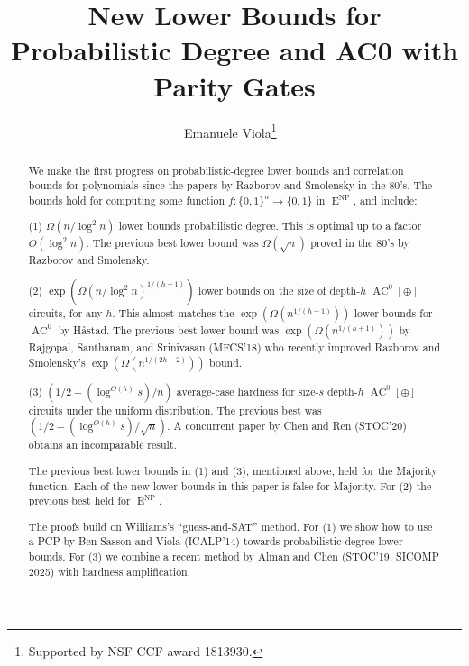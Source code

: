 \documentclass{toc}
\DeclareMathOperator{\AC}{\mathrm{AC}}  %
\DeclareMathOperator{\NP}{\mathrm{NP}}  %
\DeclareMathOperator{\EEE}{\mathrm{E}}  %
\newcommand{\zo}{\{0, 1\}}
\begin{document}
\begin{frontmatter}

\title{New Lower Bounds for Probabilistic Degree and AC0 with Parity
  Gates}
%

%



%
%
\author[viola]{Emanuele Viola\thanks{Supported by NSF CCF award 1813930.}
\,\,}
%

\begin{abstract}

We make the first progress on probabilistic-degree lower bounds and
correlation bounds for polynomials since the papers by Razborov and
Smolensky in the 80's. The bounds hold for computing some function
$f:\zo^{n}\to\zo$ in $\EEE^{\NP}$, and include:

(1) $\Omega(n/\log^{2}n)$ lower bounds probabilistic degree. This
is optimal up to a factor $O(\log^{2}n)$. The previous best lower
bound was $\Omega(\sqrt{n})$ proved in the 80's by Razborov and Smolensky.

(2) $\exp(\Omega(n/\log^{2}n)^{1/(h-1)})$ lower bounds on the size
of depth-$h$ $\AC^{0}[\oplus]$ circuits, for any $h$. This almost
matches the $\exp(\Omega(n^{1/(h-1)}))$ lower bounds for $\AC^{0}$ by
%
H{\aa}stad.  %
The previous best lower bound was $\exp(\Omega(n^{1/(h+1)}))$
by Rajgopal, Santhanam, and Srinivasan
(MFCS'18)  %
who recently improved Razborov
and Smolensky's $\exp(\Omega(n^{1/(2h-2)}))$ bound.

(3) $(1/2-(\log^{O(h)}s)/n)$ average-case hardness for size-$s$
depth-$h$ $\AC^{0}[\oplus]$ circuits under the uniform distribution.
The previous best was $(1/2-(\log^{O(h)}s)/\sqrt{n})$. A concurrent
%
paper   %
by Chen and Ren
(STOC'20)  %
obtains an incomparable result.

The %
previous best lower bounds in (1) and (3),
mentioned above,  %
held for the
Majority function. Each of the new lower bounds in this paper is false
for Majority. For (2) the previous best held for $\EEE^{\NP}$.

The proofs build on %
%
%
Williams's
``guess-and-SAT'' method. For (1)
we show how to use a PCP by Ben-Sasson and Viola 
(ICALP'14)   %
towards probabilistic-degree
lower bounds. For (3) we combine a recent %
method %
by Alman and Chen
(STOC'19, SICOMP 2025)  %
with hardness amplification.
\end{abstract}


%

%

\end{frontmatter}
\end{document}
